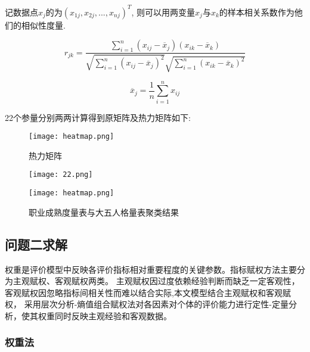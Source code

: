 \documentclass[withoutpreface,bwprint]{cumcmthesis} %
\begin{document}
记数据点$x_j$的为$(x_{1j}, x_{2j}, ... , x_{nj})^T$, 则可以用两变量$x_j$与$x_k$的样本相关系数作为他们的相似性度量.

\begin{equation}
r_{jk} = \frac{\sum_{i=1}^n (x_{ij} - \overline{x}_j)(x_{ik} - \overline{x}_k)}{\sqrt{\sum_{i=1}^n (x_{ij} - \overline{x}_j)^2} \sqrt{\sum_{i=1}^n (x_{ik} - \overline{x}_k)^2}}
\end{equation}

\begin{equation}
\overline{x}_j = \frac{1}{n} \sum_{i=1}^n x_{ij}
\end{equation}

22个参量分别两两计算得到原矩阵及热力矩阵如下:

\begin{figure}
    \centering
    \begin{minipage}[c]{0.8\textwidth}
        \centering
        \texttt{[image: heatmap.png]}
    \end{minipage}
    \caption{热力矩阵}
\end{figure}

\begin{figure}
    \centering
    \begin{minipage}[c]{0.60\textwidth}
        \centering
        \texttt{[image: 22.png]}
    \end{minipage}
    \begin{minipage}[c]{0.60\textwidth}
        \centering
        \texttt{[image: heatmap.png]}
    \end{minipage}
    \caption{职业成熟度量表与大五人格量表聚类结果}
\end{figure}






\subsection{问题二求解}


权重是评价模型中反映各评价指标相对重要程度的关键参数。指标赋权方法主要分为主观赋权、客观赋权两类。
主观赋权因过度依赖经验判断而缺乏一定客观性，客观赋权因忽略指标间相关性而难以结合实际,本文模型结合主观赋权和客观赋权，
采用层次分析-熵值组合赋权法对各因素对个体的评价能力进行定性-定量分析，使其权重同时反映主观经验和客观数据。
\subsubsection{权重法}
\end{document}
